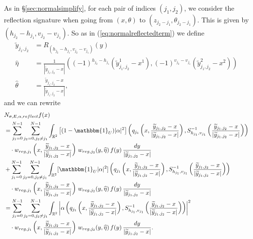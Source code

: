 \documentclass[10pt]{amsart}
\theoremstyle{definition}
\theoremstyle{definition}
\theoremstyle{definition}
\newcommand{ \rn }[1]{\mathbb{R}^{#1}}
\begin{document}
As in \S \ref{sec:normalsimplify}, for each pair of indices $(j_{1},j_{2})$, we consider the reflection signature when going from $(x,\theta)$ to $(z_{j_{2}-j_{1}}, \theta_{j_{2}-j_{1}})$. This is given by $(h_{j_{2}}- h_{j_{1}}, v_{j_{2}}-v_{j_{1}})$. So as in (\ref{eq:normalreflectedterm}) we define
\begin{align*}
\widetilde{y}_{j_{1},j_{2}} & = R_{(h_{j_{2}}-h_{j_{1}}, v_{j_{2}}-v_{j_{1}})}(y)\\
\widehat{\eta} & = \frac{1}{|\widetilde{y}_{j_{1},j_{2}}-x|}( (-1)^{h_{j_{2}}-h_{j_{1}}}(\widetilde{y}_{j_{1},j_{2}}^{1}- x^{1}), (-1)^{v_{j_{2}}-v_{j_{1}}}(\widetilde{y}_{j_{1},j_{2}}^{2} - x^{2}))\\
\widehat{\theta} & = \frac{\widetilde{y}_{j_{1},j_{2}} - x}{|\widetilde{y}_{j_{1},j_{2}} - x|},
\end{align*}
and we can rewrite
\begin{align}
 & N_{\sigma, E, \alpha, reflect}f(x) \notag\\
 & = \sum_{j_{1}=0}^{N-1}\sum_{j_{2}=0, j_{2}\neq j_{1}}^{N-1}\int_{\rn{2}}\left[(1-\mathbbm{1}_{U})|\alpha|^{2}\right] \left(q_{j_{1}}\left(x,\frac{\widetilde{y}_{j_{1},j_{2}} - x}{|\widetilde{y}_{j_{1},j_{2}} - x|}\right), S_{h_{j_{1}},v_{j_{1}}}^{-1}\left(\frac{\widetilde{y}_{j_{1},j_{2}} - x}{|\widetilde{y}_{j_{1},j_{2}} - x|}\right)\right)\notag\\
 & \quad \cdot w_{reg,j_{1}}\left(x,\frac{\widetilde{y}_{j_{1},j_{2}} - x}{|\widetilde{y}_{j_{1},j_{2}} - x|}\right) \, w_{reg,j_{2}}(y, \widehat{\eta})\, f(y) \, \frac{dy}{|\widetilde{y}_{j_{1},j_{2}} - x|}\notag\\
& +  \sum_{j_{1}=0}^{N-1}\sum_{j_{2}=0, j_{2}\neq j_{1}}^{N-1}\int_{\rn{2}}[\mathbbm{1}_{U}|\alpha|^{2}]\left(q_{j_{1}}\left(x,\frac{\widetilde{y}_{j_{1},j_{2}} - x}{|\widetilde{y}_{j_{1},j_{2}} - x|}\right), S_{h_{j_{1}},v_{j_{1}}}^{-1}\left(\frac{\widetilde{y}_{j_{1},j_{2}} - x}{|\widetilde{y}_{j_{1},j_{2}} - x|}\right)\right)\notag\\
 & \quad \cdot w_{reg,j_{1}}\left(x,\frac{\widetilde{y}_{j_{1},j_{2}} - x}{|\widetilde{y}_{j_{1},j_{2}} - x|}\right) \, w_{reg,j_{2}}(y, \widehat{\eta})\, f(y) \, \frac{dy}{|\widetilde{y}_{j_{1},j_{2}} - x|}\notag\\
 & = \sum_{j_{1}=0}^{N-1}\sum_{j_{2}=0, j_{2}\neq j_{1}}^{N-1}\int_{\rn{2}}\left| \alpha \left(q_{j_{1}}\left(x,\frac{\widetilde{y}_{j_{1},j_{2}} - x}{|\widetilde{y}_{j_{1},j_{2}} - x|}\right), S_{h_{j_{1}},v_{j_{1}}}^{-1}\left(\frac{\widetilde{y}_{j_{1},j_{2}} - x}{|\widetilde{y}_{j_{1},j_{2}} - x|}\right)\right) \right|^{2}\notag\\
 & \quad \cdot w_{reg,j_{1}}\left(x,\frac{\widetilde{y}_{j_{1},j_{2}} - x}{|\widetilde{y}_{j_{1},j_{2}} - x|}\right) \, w_{reg,j_{2}}(y, \widehat{\eta})\, f(y) \, \frac{dy}{|\widetilde{y}_{j_{1},j_{2}} - x|}\label{eq:normalreflectbigkahuna}.
\end{align}
\end{document}
